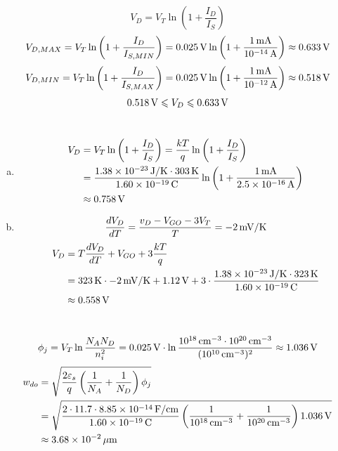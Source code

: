 \documentclass{article}
\newcommand{\unit}[1]{{\rm\,#1}}
\begin{document}
\section{}
$$V_D=V_T\ln\left(1+\frac{I_D}{I_S}\right)$$
$$V_{D,MAX}=V_T\ln\left(1+\frac{I_D}{I_{S,MIN}}\right)=0.025\unit{V}\ln\left(1+\frac{1\unit{mA}}{10^{-14}\unit{A}}\right)\approx0.633\unit{V}$$
$$V_{D,MIN}=V_T\ln\left(1+\frac{I_D}{I_{S,MAX}}\right)=0.025\unit{V}\ln\left(1+\frac{1\unit{mA}}{10^{-12}\unit{A}}\right)\approx0.518\unit{V}$$
$$0.518\unit{V}\leqslant V_D\leqslant0.633\unit{V}$$

\section{}
\begin{enumerate}[(a)]
\item
\begin{align*}
V_D&=V_T\ln\left(1+\frac{I_D}{I_S}\right)=\frac{kT}{q}\ln\left(1+\frac{I_D}{I_S}\right)\\
&=\frac{1.38\times10^{-23}\unit{J/K}\cdot303\unit{K}}{1.60\times10^{-19}\unit{C}}\ln\left(1+\frac{1\unit{mA}}{2.5\times10^{-16}\unit{A}}\right)\\
&\approx0.758\unit{V}
\end{align*}
\item
$$\frac{dV_D}{dT}=\frac{v_D-V_{GO}-3V_T}{T}=-2\unit{mV/K}$$
\begin{align*}
V_D&=T\frac{dV_D}{dT}+V_{GO}+3\frac{kT}{q}\\
&=323\unit{K}\cdot-2\unit{mV/K}+1.12\unit{V}+3\cdot\frac{1.38\times10^{-23}\unit{J/K}\cdot323\unit{K}}{1.60\times10^{-19}\unit{C}}\\
&\approx0.558\unit{V}
\end{align*}
\end{enumerate}

\section{}
$$\phi_j=V_T\ln\frac{N_AN_D}{n_i^2}=0.025\unit{V}\cdot\ln\frac{10^{18}\unit{cm^{-3}}\cdot10^{20}\unit{cm^{-3}}}{(10^{10}\unit{cm^{-3}})^2}\approx1.036\unit{V}$$
\begin{align*}
w_{do}&=\sqrt{\frac{2\varepsilon_s}{q}\left(\frac{1}{N_A}+\frac{1}{N_D}\right)\phi_j}\\
&=\sqrt{\frac{2\cdot11.7\cdot8.85\times10^{-14}\unit{F/cm}}{1.60\times10^{-19}\unit{C}}\left(\frac{1}{10^{18}\unit{cm^{-3}}}+\frac{1}{10^{20}\unit{cm^{-3}}}\right)1.036\unit{V}}\\
&\approx3.68\times10^{-2}\unit{\mu m}
\end{align*}
\end{document}
